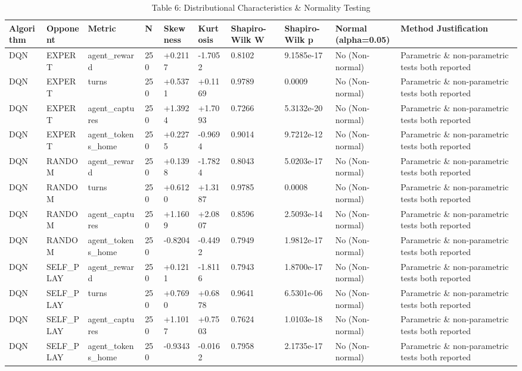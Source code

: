 \begin{table}
\caption{Table 6: Distributional Characteristics & Normality Testing}
\label{tab:table6_distributional_normality_tests}
\begin{tabular}{llllllllll}
\toprule
Algorithm & Opponent & Metric & N & Skewness & Kurtosis & Shapiro-Wilk W & Shapiro-Wilk p & Normal (alpha=0.05) & Method Justification \\
\midrule
DQN & EXPERT & agent\_reward & 250 & +0.2117 & -1.7052 & 0.8102 & 9.1585e-17 & No (Non-normal) & Parametric \& non-parametric tests both reported \\
DQN & EXPERT & turns & 250 & +0.5371 & +0.1169 & 0.9789 & 0.0009 & No (Non-normal) & Parametric \& non-parametric tests both reported \\
DQN & EXPERT & agent\_captures & 250 & +1.3924 & +1.7093 & 0.7266 & 5.3132e-20 & No (Non-normal) & Parametric \& non-parametric tests both reported \\
DQN & EXPERT & agent\_tokens\_home & 250 & +0.2275 & -0.9694 & 0.9014 & 9.7212e-12 & No (Non-normal) & Parametric \& non-parametric tests both reported \\
DQN & RANDOM & agent\_reward & 250 & +0.1398 & -1.7824 & 0.8043 & 5.0203e-17 & No (Non-normal) & Parametric \& non-parametric tests both reported \\
DQN & RANDOM & turns & 250 & +0.6120 & +1.3187 & 0.9785 & 0.0008 & No (Non-normal) & Parametric \& non-parametric tests both reported \\
DQN & RANDOM & agent\_captures & 250 & +1.1609 & +2.0807 & 0.8596 & 2.5093e-14 & No (Non-normal) & Parametric \& non-parametric tests both reported \\
DQN & RANDOM & agent\_tokens\_home & 250 & -0.8204 & -0.4492 & 0.7949 & 1.9812e-17 & No (Non-normal) & Parametric \& non-parametric tests both reported \\
DQN & SELF\_PLAY & agent\_reward & 250 & +0.1211 & -1.8116 & 0.7943 & 1.8700e-17 & No (Non-normal) & Parametric \& non-parametric tests both reported \\
DQN & SELF\_PLAY & turns & 250 & +0.7690 & +0.6878 & 0.9641 & 6.5301e-06 & No (Non-normal) & Parametric \& non-parametric tests both reported \\
DQN & SELF\_PLAY & agent\_captures & 250 & +1.1017 & +0.7503 & 0.7624 & 1.0103e-18 & No (Non-normal) & Parametric \& non-parametric tests both reported \\
DQN & SELF\_PLAY & agent\_tokens\_home & 250 & -0.9343 & -0.0162 & 0.7958 & 2.1735e-17 & No (Non-normal) & Parametric \& non-parametric tests both reported \\

\end{tabular}
\end{table}
